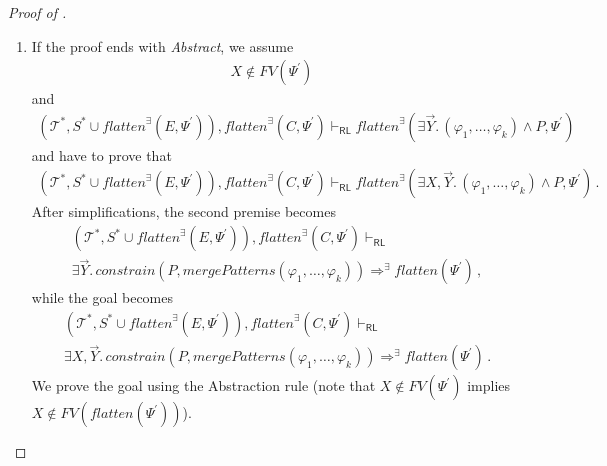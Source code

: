 \documentclass{article}
\newcommand{\RL}{\mathsf{RL}}
\begin{document}
\begin{proof}[Proof of ]
\begin{enumerate}
        
    \item If the proof ends with \emph{Abstract},
    we assume
    \begin{align*}
        X \not\in \mathit{FV}(\Psi^\prime)
    \end{align*}
    and
    \begin{align*}
                (\mathcal{T}^*, S^* \cup \mathit{flatten}^\exists(E, \Psi^\prime)), \mathit{flatten}^\exists(C, \Psi^\prime) \vdash_\RL
          \mathit{flatten}^\exists(\exists \vec{Y}.\, (\varphi_1, \ldots, \varphi_k) \land P, \Psi^\prime)
    \end{align*}
    and have to prove that
    \begin{align*}
                (\mathcal{T}^*, S^* \cup \mathit{flatten}^\exists(E, \Psi^\prime)), \mathit{flatten}^\exists(C, \Psi^\prime) \vdash_\RL
          \mathit{flatten}^\exists(\exists X,\vec{Y}.\, (\varphi_1, \ldots, \varphi_k) \land P, \Psi^\prime) \, .
    \end{align*}
    After simplifications, the second premise becomes
    \begin{align*}
            &(\mathcal{T}^*, S^* \cup \mathit{flatten}^\exists(E, \Psi^\prime)), \mathit{flatten}^\exists(C, \Psi^\prime) \vdash_\RL
          \\& \exists \vec{Y}.\, \mathit{constrain}(P, \mathit{mergePatterns}(\varphi_1, \ldots, \varphi_k))
          \Rightarrow^\exists \mathit{flatten}(\Psi^\prime) \, ,
    \end{align*}
    while the goal becomes
    \begin{align*}
          &(\mathcal{T}^*, S^* \cup \mathit{flatten}^\exists(E, \Psi^\prime)), \mathit{flatten}^\exists(C, \Psi^\prime) \vdash_\RL
          \\&\exists X,\vec{Y}.\, \mathit{constrain}(P, \mathit{mergePatterns}(\varphi_1, \ldots, \varphi_k))
          \Rightarrow^\exists \mathit{flatten}(\Psi^\prime) \, .
    \end{align*}
    We prove the goal using the Abstraction rule
    (note that $X \not\in \mathit{FV}(\Psi^\prime)$ implies $X \not\in \mathit{FV}(\mathit{flatten}(\Psi^\prime))$).
    
    \end{enumerate}
\end{proof}
\end{document}
